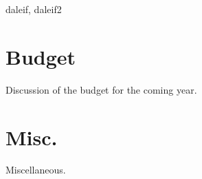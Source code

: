 \documentclass[english,unit=imfau]{aultrdesign}
\begin{document}
\begin{ColophonData}
\end{ColophonData}

\begin{InformationArea}
  \meetingdate{\today}
  \begin{participants}
    daleif, daleif2
  \end{participants}
\end{InformationArea}


\begin{agenda}


\section{Budget}

Discussion of the budget for the coming year.

\section{Misc.}

Miscellaneous.

\end{agenda}
\end{document}
